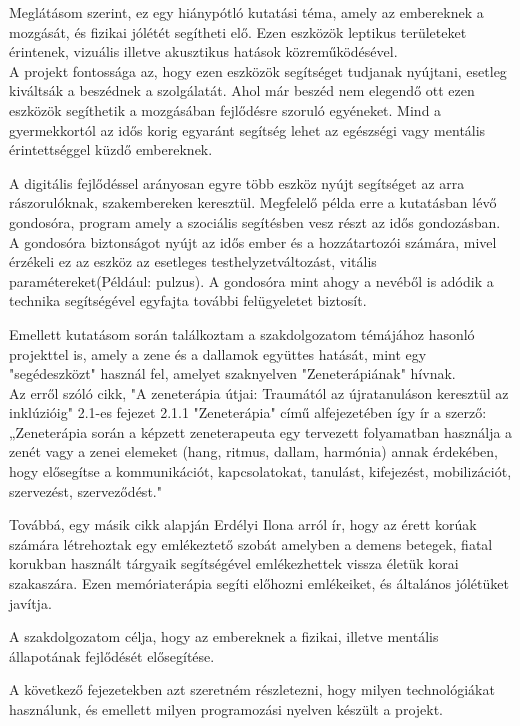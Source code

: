 \documentclass[tocnopagenum]{thesis-ekf}
\theoremstyle{definition}
\theoremstyle{remark}
\begin{document}
	Meglátásom szerint, ez egy hiánypótló kutatási téma, amely az embereknek a mozgását, és fizikai jólétét segítheti elő.
	Ezen eszközök leptikus területeket érintenek, vizuális illetve akusztikus hatások közreműködésével.
	\\
	A projekt fontossága az, hogy ezen eszközök segítséget tudjanak nyújtani, esetleg kiváltsák a beszédnek a szolgálatát. Ahol már beszéd nem elegendő ott ezen eszközök segíthetik a mozgásában fejlődésre szoruló egyéneket. Mind a gyermekkortól az idős korig egyaránt segítség lehet az egészségi vagy mentális érintettséggel küzdő embereknek.
	\par
	A digitális fejlődéssel arányosan egyre több eszköz nyújt segítséget az arra rászorulóknak, szakembereken keresztül. Megfelelő példa erre a kutatásban lévő gondosóra, program amely a szociális segítésben vesz részt az idős gondozásban. A gondosóra biztonságot nyújt az idős ember és a hozzátartozói számára, mivel érzékeli ez az eszköz az esetleges testhelyzetváltozást, vitális paramétereket(Például: pulzus). A gondosóra mint ahogy a nevéből is adódik a technika segítségével egyfajta további felügyeletet biztosít.\cite{MTI}
	\par
	Emellett kutatásom során találkoztam a szakdolgozatom témájához hasonló projekttel is, amely a zene és a dallamok együttes hatását, mint egy "segédeszközt" használ fel, amelyet szaknyelven "Zeneterápiának" hívnak.\cite{zsofia2021zeneterapia}
	\\
	Az erről szóló cikk, "A zeneterápia útjai: Traumától az újratanuláson keresztül az inklúzióig" 2.1-es fejezet 2.1.1 "Zeneterápia" című alfejezetében így ír a szerző:
	„Zeneterápia során a képzett zeneterapeuta egy tervezett folyamatban használja a zenét vagy a zenei elemeket (hang, ritmus, dallam, harmónia) annak érdekében, hogy elősegítse a kommunikációt, kapcsolatokat, tanulást, kifejezést, mobilizációt, szervezést, szerveződést."
	\par
	Továbbá, egy másik cikk alapján Erdélyi Ilona arról ír, hogy az érett korúak számára létrehoztak egy emlékeztető szobát amelyben a demens betegek, fiatal korukban használt tárgyaik segítségével emlékezhettek vissza életük korai szakaszára. Ezen memóriaterápia segíti előhozni emlékeiket, és általános jólétüket javítja.\cite{erdelyiilonademensbetegek}
	
	A szakdolgozatom célja, hogy az embereknek a fizikai, illetve mentális állapotának fejlődését elősegítése.
	\par 
	
	A következő fejezetekben azt szeretném részletezni, hogy milyen technológiákat használunk, és emellett milyen programozási nyelven készült a projekt. \\ 
\end{document}
